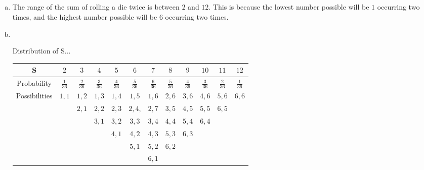 \documentclass[10pt]{report}
\begin{document}
    \subsection{}
 \begin{enumerate}[(a)]
 \item The range of the sum of rolling a die twice is between $2 $ and $12 $. This is because the lowest number possible will be $1 $ occurring two times, and the highest number possible will be $6$ occurring two times.
 \item \ \\
 \begin{center}
        Distribution of S...\\
 \begin{tabular}{|c| c|c |c |c|c|c|c|c|c|c|c|} 
 \hline
 S & $2$& $3$ & $4$  & $5$ &$6$ &$7$ & $8$ & $9$ & $10 $& $11 $& $12$ \\
 \hline
 Probability & $\frac{1}{36}$  &$\frac{2}{36}$  &  $\frac{3}{36}$ &  $\frac{4}{36}$& $\frac{5}{36}$& $\frac{6}{36}$&  $\frac{5}{36}$&  $\frac{4}{36}$&$\frac{3}{36}$  & $\frac{2}{36}$ & $\frac{1}{36}$ \\
 \hline
 Possibilities & $1,1 $ & $1,2$ & $1,3$  & $1,4$&$1,5$ &$1,6$ & $2,6$ & $3,6$ & $4,6$ & $5,6$ & $6,6$ \\
  &  & $2,1$ & $2,2$  &  $2,3$&$2,4$, &$2,7$& $3,5$ & $4,5$ & $5,5$ & $6,5$ &  \\  
  &  &  & $3,1$  & $3,2$ &$3,3$ &$3,4$ & $4,4$ & $5,4$ & $6,4$ &  &  \\  
  &  &  &   & $4,1$ &$4,2$ &$4,3$ & $5,3$ & $6,3$ &  &  &  \\  
  &  &  &   &  &$5,1$ &$5,2$ & $6,2$ &  &  & &  \\
    &  &  &   &  & &$6,1$ & & &  &  &  \\
 \hline
 \end{tabular}
 \end{center}
 \end{enumerate}
\end{document}
